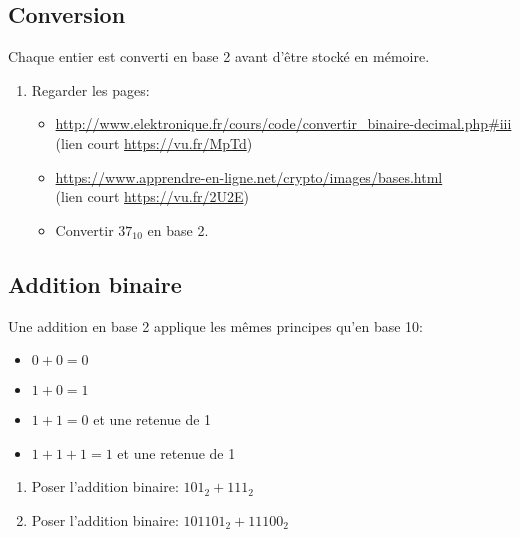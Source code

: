\documentclass[a4paper,11pt]{article}
\begin{document}
\begin{Form}
\subsection{Conversion}
Chaque entier est converti en base 2 avant d'être stocké en mémoire.
\begin{activite}
\begin{enumerate}
\item Regarder les pages:
\begin{itemize}
\item \url{http://www.elektronique.fr/cours/code/convertir_binaire-decimal.php#iii} (lien court \url{https://vu.fr/MpTd})
\item \url{https://www.apprendre-en-ligne.net/crypto/images/bases.html}\\(lien court \url{https://vu.fr/2U2E})
\item Convertir $37_{10}$ en base 2.
\end{itemize}
\end{enumerate}
\end{activite}
\subsection{Addition binaire}
Une addition en base 2 applique les mêmes principes qu'en base 10:
\begin{itemize}
\item $0 + 0 = 0$
\item $1 + 0 = 1$
\item $1 + 1 = 0$ et une retenue de 1
\item $1 + 1 + 1 = 1$ et une retenue de 1
\end{itemize}
\begin{activite}
\begin{enumerate}
\item Poser l'addition binaire: $101_2 + 111_2$
\item Poser l'addition binaire: $101101_2 + 11100_2$
\end{enumerate}
\end{activite}

\end{Form}
\end{document}
